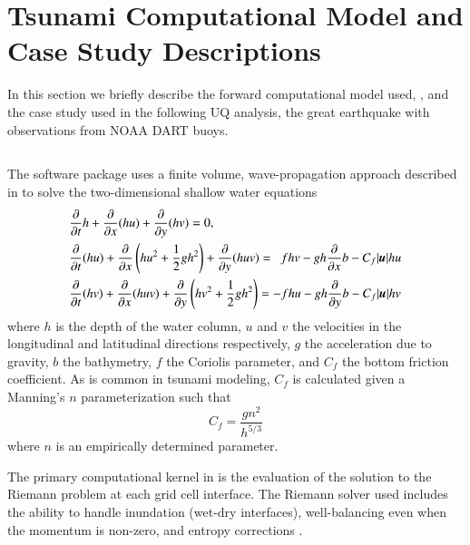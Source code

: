 
\section{Tsunami Computational Model and Case Study Descriptions} \label{sec:model_description}

In this section we briefly describe the forward computational model used, \geoclaw, and the case study used in the following UQ analysis, the great \tohoku earthquake with observations from NOAA DART buoys.

\subsection{\geoclaw} \label{ssub:geoclaw}

The \geoclaw software package uses a finite volume, wave-propagation approach described in \cite{LeVeque:1997eg} to solve the two-dimensional shallow water equations
\begin{equation} \label{eq:swe}
    \begin{aligned}
    &\pd{}{t} h + \pd{}{x} (hu) + \pd{}{y} (hv) = 0, \\
    &\pd{}{t}(hu) + \pd{}{x} \left(hu^2 + \frac{1}{2} g h^2 \right ) + \pd{}{y} (huv) = ~~ fhv - gh \pd{}{x} b - C_f |\vec{u}| hu \\
    &\pd{}{t} (hv) + \pd{}{x} (huv) + \pd{}{y} \left (hv^2 + \frac{1}{2} gh^2 \right) = -fhu - gh \pd{}{y} b - C_f |\vec{u}| hv
    \end{aligned}
\end{equation}
where $h$ is the depth of the water column, $u$ and $v$ the velocities in the longitudinal and latitudinal directions respectively, $g$ the acceleration due to gravity, $b$ the bathymetry, $f$ the Coriolis parameter, and $C_f$ the bottom friction coefficient.  As is common in tsunami modeling, $C_f$ is calculated given a Manning's $n$ parameterization such that
\begin{equation}
    C_f = \frac{g n^2}{h^{5/3}}
\end{equation}
where $n$ is an empirically determined parameter.  

The primary computational kernel in \geoclaw is the evaluation of the solution to the Riemann problem at each grid cell interface.  The Riemann solver used includes the ability to handle inundation (wet-dry interfaces), well-balancing even when the momentum is non-zero, and entropy corrections \cite{George:2008aa}.

